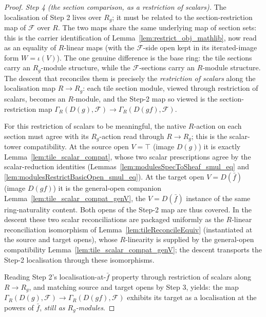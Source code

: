 \begin{proof}
  \emph{Step 4 (the section comparison, as a restriction of scalars).} The localisation of Step 2 lives
  over \(R_g\); it must be related to the section-restriction map of \(\mathcal{F}\) over \(R\). The two
  maps share the same underlying map of section sets: this is the carrier identification of
  Lemma~\ref{lem:restrict_obj_mathlib}, now read as an equality of \(R\)-linear maps (with the
  \(\mathcal{F}\)-side open kept in its iterated-image form \(W = \iota(V)\)). The one genuine difference
  is the base ring: the tile sections carry an \(R_g\)-module structure, while the
  \(\mathcal{F}\)-sections carry an \(R\)-module structure. The descent that reconciles them is precisely
  the \emph{restriction of scalars} along the localisation map \(R \to R_g\): each tile section module,
  viewed through restriction of scalars, becomes an \(R\)-module, and the Step-2 map so viewed is the
  section-restriction map \(\Gamma_R(D(g), \mathcal{F}) \to \Gamma_R(D(gf), \mathcal{F})\).

  For this restriction of scalars to be meaningful, the native \(R\)-action on each section must agree
  with its \(R_g\)-action read through \(R \to R_g\); this is the scalar-tower compatibility. At the
  source open \(V = \top\) (image \(D(g)\)) it is exactly Lemma~\ref{lem:tile_scalar_compat}, whose two
  scalar prescriptions agree by the scalar-reduction identities
  (Lemmas~\ref{lem:modulesSpecToSheaf_smul_eq} and \ref{lem:modulesRestrictBasicOpen_smul_eq}). At the
  target open \(V = D(\bar f)\) (image \(D(gf)\)) it is the general-open companion
  Lemma~\ref{lem:tile_scalar_compat_genV}, the \(V = D(\bar f)\) instance of the same ring-naturality
  content. Both opens of the Step-2 map are thus covered. In the descent these two scalar
  reconciliations are packaged uniformly as the \(R\)-linear reconciliation isomorphism of
  Lemma~\ref{lem:tileReconcileEquiv} (instantiated at the source and target opens), whose
  \(R\)-linearity is supplied by the general-open compatibility Lemma~\ref{lem:tile_scalar_compat_genV};
  the descent transports the Step-2 localisation through these isomorphisms.

  Reading Step 2's localisation-at-\(\bar f\) property through restriction of scalars along
  \(R \to R_g\), and matching source and target opens by Step 3, yields: the map
  \(\Gamma_R(D(g), \mathcal{F}) \to \Gamma_R(D(gf), \mathcal{F})\) exhibits its target as a localisation
  at the powers of \(\bar f\), \emph{still as \(R_g\)-modules}.


\end{proof}
